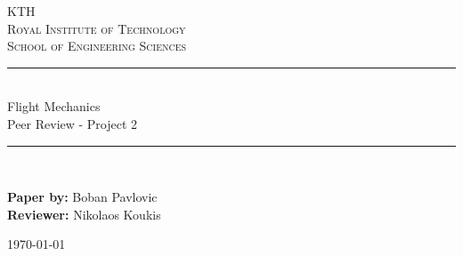 \newcommand{\horrule}[1]{\rule{\linewidth}{#1}} %

\begin{titlepage}

\begin{center}
\normalfont \normalsize 
\textsc{KTH}\\
\textsc{Royal Institute of Technology} \\  %
\textsc{School of Engineering Sciences} \\ [25pt] %
\horrule{0.5pt} \\[0.4cm] %
\huge Flight Mechanics \vspace{5mm}\\ Peer Review - Project 2 \\ %
\horrule{2pt} \\[0.5cm] %
\vspace*{10mm}
\end{center}

\normalfont \normalsize
\begin{flushleft}
\textbf{Paper by:} Boban Pavlovic\\
\textbf{Reviewer:} Nikolaos Koukis\\
\end{flushleft}

\vfill
\begin{center}
    \today
\end{center}
\end{titlepage}
